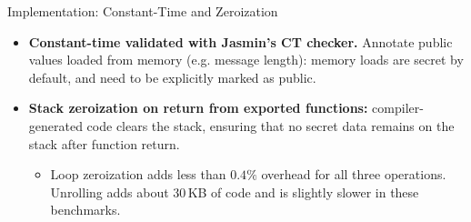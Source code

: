 \begin{frame}{Implementation: Constant-Time and Zeroization}
  \begin{itemize}
      \setlength{\itemsep}{4mm}
    \item \textbf{Constant-time validated with Jasmin's CT checker.}
      Annotate public values loaded from memory (e.g. message length):
      memory loads are secret by default, and need to be explicitly
      marked as public.
    \item \textbf{Stack zeroization on return from exported functions:}
      compiler-generated code clears the stack, ensuring that no
      secret data remains on the stack after
      function return.
      \begin{itemize}
          \setlength{\itemsep}{1mm}
        \item Loop zeroization adds less than $0.4\%$ overhead for
          all three operations.
          Unrolling adds about 30\,KB of code and is slightly slower in these
          benchmarks.
      \end{itemize}
  \end{itemize}
\end{frame}
